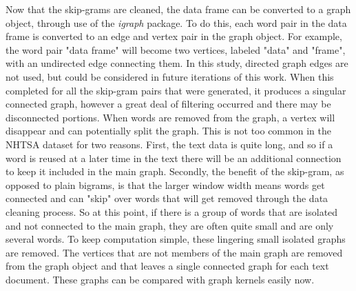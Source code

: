 Now that the skip-grams are cleaned, the data frame can be converted to a graph object, through use of the \textit{igraph} package. To do this, each word pair in the data frame is converted to an edge and vertex pair in the graph object. For example, the word pair "data frame" will become two vertices, labeled "data" and "frame", with an undirected edge connecting them. In this study, directed graph edges are not used, but could be considered in future iterations of this work. When this completed for all the skip-gram pairs that were generated, it produces a singular connected graph, however a great deal of filtering occurred and there may be disconnected portions. When words are removed from the graph, a vertex will disappear and can potentially split the graph. This is not too common in the NHTSA dataset for two reasons. First, the text data is quite long, and so if a word is reused at a later time in the text there will be an additional connection to keep it included in the main graph. Secondly, the benefit of the skip-gram, as opposed to plain bigrams, is that the larger window width means words get connected and can "skip" over words that will get removed through the data cleaning process. So at this point, if there is a group of words that are isolated and not connected to the main graph, they are often quite small and are only several words. To keep computation simple, these lingering small isolated graphs are removed. The vertices that are not members of the main graph are removed from the graph object and that leaves a single connected graph for each text document. These graphs can be compared with graph kernels easily now. 



